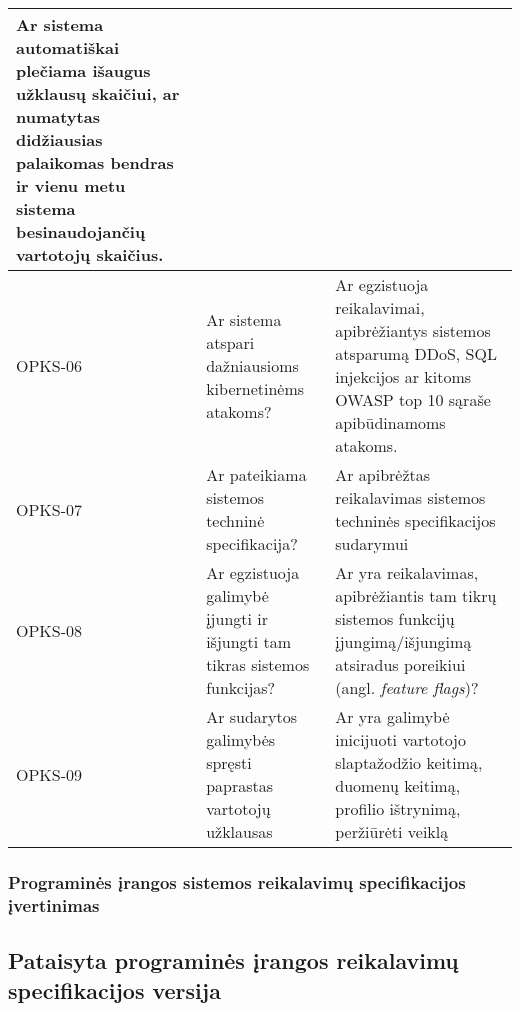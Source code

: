 \documentclass{VUMIFPSkursinis}
\begin{document}
\begin{center}
\begin{longtable}{|C{2cm}|L{5cm}|L{8cm}|}
		Ar sistema automatiškai plečiama išaugus užklausų skaičiui, ar numatytas didžiausias palaikomas bendras ir vienu metu sistema besinaudojančių vartotojų skaičius.                             \\ \hline
		OPKS-06                                                                                                 &
		Ar sistema atspari dažniausioms kibernetinėms atakoms?                                                  &
		Ar egzistuoja reikalavimai, apibrėžiantys sistemos atsparumą DDoS, SQL injekcijos ar kitoms OWASP top 10 sąraše apibūdinamoms atakoms.                                                        \\ \hline
		OPKS-07                                                                                                 &
		Ar pateikiama sistemos techninė specifikacija?                                                          &
		Ar apibrėžtas reikalavimas sistemos techninės specifikacijos sudarymui                                                                                                                        \\ \hline
		OPKS-08                                                                                                 &
		Ar egzistuoja galimybė įjungti ir išjungti tam tikras sistemos funkcijas?                               &
		Ar yra reikalavimas, apibrėžiantis tam tikrų sistemos funkcijų įjungimą/išjungimą atsiradus poreikiui (angl. \textit{feature flags})?                                                         \\ \hline
		OPKS-09                                                                                                 &
		Ar sudarytos galimybės spręsti paprastas vartotojų užklausas                                            &
		Ar yra galimybė inicijuoti vartotojo slaptažodžio keitimą, duomenų keitimą, profilio ištrynimą, peržiūrėti veiklą                                                                             \\ \hline
	\end{longtable}
\end{center}

\subsubsection{Programinės įrangos sistemos reikalavimų specifikacijos įvertinimas}

\subsection{Pataisyta programinės įrangos reikalavimų specifikacijos versija}
\end{document}
